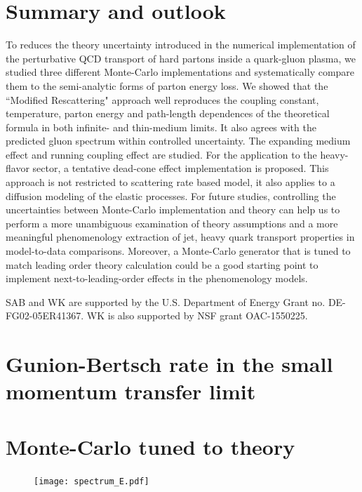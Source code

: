 \documentclass[aps, prc, reprint, amsmath, groupedaddress, nofootinbib]{revtex4-1}
\begin{document}
\section{Summary and outlook}\label{section:summary}
To reduces the theory uncertainty introduced in the numerical implementation of the perturbative QCD transport of hard partons inside a quark-gluon plasma, we studied three different Monte-Carlo implementations and systematically compare them to the semi-analytic forms of parton energy loss.
We showed that the ``Modified Rescattering" approach well reproduces the coupling constant, temperature, parton energy and path-length dependences of the theoretical formula in both infinite- and thin-medium limits.
It also agrees with the predicted gluon spectrum within controlled uncertainty.
The expanding medium effect and running coupling effect are studied. For the application to the heavy-flavor sector, a tentative dead-cone effect implementation is proposed.
This approach is not restricted to scattering rate based model, it also applies to a diffusion modeling of the elastic processes. 
For future studies, controlling the uncertainties between Monte-Carlo implementation and theory can help us to perform a more unambiguous examination of theory assumptions and a more meaningful phenomenology extraction of jet, heavy quark transport properties in model-to-data comparisons.
Moreover, a Monte-Carlo generator that is tuned to match leading order theory calculation could be a good starting point to implement next-to-leading-order effects in the phenomenology models.

\begin{acknowledgments}
SAB and WK  are supported by the U.S. Department of Energy Grant no. DE-FG02-05ER41367. WK is also supported by NSF grant OAC-1550225.
\end{acknowledgments}

\begin{appendices}
\section{Gunion-Bertsch rate in the small momentum transfer limit}\label{app:consistency}
\section{Monte-Carlo tuned to theory}\label{app:tune-spectrum}
\begin{figure}
\texttt{[image: spectrum\_E.pdf]}
\caption{}
\label{fig:tuned-spectrum}
\end{figure}

\label{app:tune}
\end{appendices}
 
\end{document}
